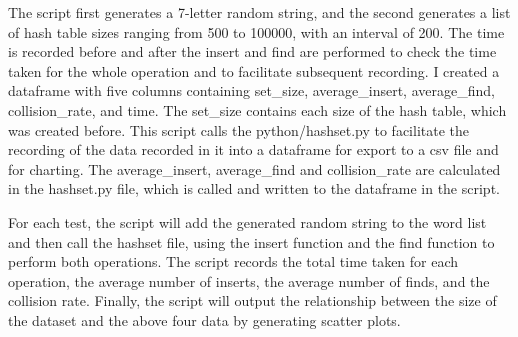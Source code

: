 \documentclass[a4]{article}
\begin{document}
The script first generates a 7-letter random string, and the second generates a list of hash table sizes ranging from 500 to 100000, with an interval of 200. The time is recorded before and after the insert and find are performed to check the time taken for the whole operation and to facilitate subsequent recording. I created a dataframe with five columns containing set\_size, average\_insert, average\_find, collision\_rate, and time. The set\_size contains each size of the hash table, which was created before. This script calls the python/hashset.py to facilitate the recording of the data recorded in it into a dataframe for export to a csv file and for charting. The average\_insert, average\_find and collision\_rate are calculated in the hashset.py file, which is called and written to the dataframe in the script.

For each test, the script will add the generated random string to the word list and then call the hashset file, using the insert function and the find function to perform both operations. The script records the total time taken for each operation, the average number of inserts, the average number of finds, and the collision rate. Finally, the script will output the relationship between the size of the dataset and the above four data by generating scatter plots.
\end{document}
